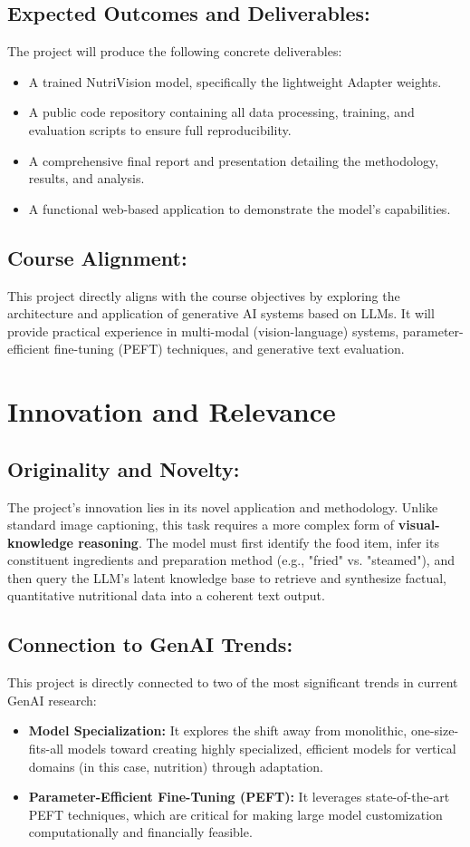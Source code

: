 \documentclass{article}
\begin{document}
\subsection{Expected Outcomes and Deliverables: }
The project will produce the following concrete deliverables:
\begin{itemize}
    \item A trained NutriVision model, specifically the lightweight Adapter weights.
    \item A public code repository containing all data processing, training, and evaluation scripts to ensure full reproducibility.
    \item A comprehensive final report and presentation detailing the methodology, results, and analysis.
    \item A functional web-based application to demonstrate the model's capabilities.
\end{itemize}

\subsection{Course Alignment:} 
This project directly aligns with the course objectives by exploring the architecture and application of generative AI systems based on LLMs. It will provide practical experience in multi-modal (vision-language) systems, parameter-efficient fine-tuning (PEFT) techniques, and generative text evaluation.

\section{Innovation and Relevance} 
\subsection{Originality and Novelty: } 
The project's innovation lies in its novel application and methodology. Unlike standard image captioning, this task requires a more complex form of \textbf{visual-knowledge reasoning}. The model must first identify the food item, infer its constituent ingredients and preparation method (e.g., "fried" vs. "steamed"), and then query the LLM's latent knowledge base to retrieve and synthesize factual, quantitative nutritional data into a coherent text output.
\subsection{Connection to GenAI Trends: } 
This project is directly connected to two of the most significant trends in current GenAI research:
\begin{itemize}
    \item \textbf{Model Specialization:} It explores the shift away from monolithic, one-size-fits-all models toward creating highly specialized, efficient models for vertical domains (in this case, nutrition) through adaptation.
    \item \textbf{Parameter-Efficient Fine-Tuning (PEFT):} It leverages state-of-the-art PEFT techniques, which are critical for making large model customization computationally and financially feasible.
\end{itemize}
\end{document}
